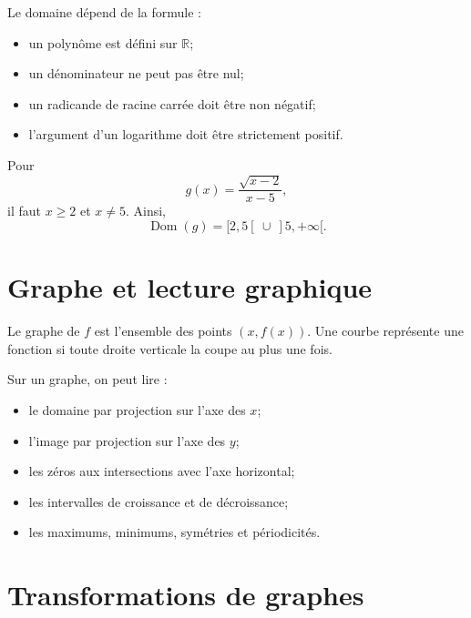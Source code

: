 \documentclass[12pt,a4paper,openany]{book}
\newcommand{\R}{\mathbb{R}}
\newcommand{\dom}{\operatorname{Dom}}
\begin{document}
Le domaine dépend de la formule :
\begin{itemize}
\item un polynôme est défini sur $\R$;
\item un dénominateur ne peut pas être nul;
\item un radicande de racine carrée doit être non négatif;
\item l'argument d'un logarithme doit être strictement positif.
\end{itemize}

\begin{examplebox}
Pour
\[
g(x)=\frac{\sqrt{x-2}}{x-5},
\]
il faut $x\ge2$ et $x\neq5$. Ainsi,
\[
\dom(g)=[2,5[\ \cup\ ]5,+\infty[.
\]
\end{examplebox}

\section{Graphe et lecture graphique}

Le graphe de $f$ est l'ensemble des points $(x,f(x))$. Une courbe représente une fonction si toute droite verticale la coupe au plus une fois.

\begin{center}
\end{center}

Sur un graphe, on peut lire :
\begin{itemize}
\item le domaine par projection sur l'axe des $x$;
\item l'image par projection sur l'axe des $y$;
\item les zéros aux intersections avec l'axe horizontal;
\item les intervalles de croissance et de décroissance;
\item les maximums, minimums, symétries et périodicités.
\end{itemize}

\section{Transformations de graphes}
\end{document}
